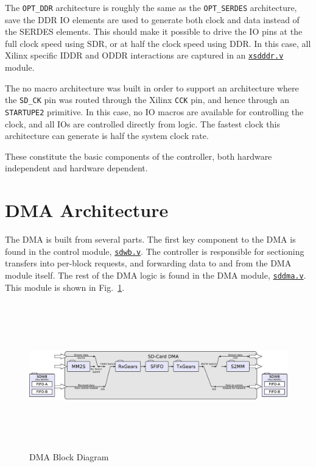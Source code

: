 \documentclass{gqtekspec}
\newcommand{\zhref}[2]{\href{#1}{\textcolor{dkblue}{#2}}}
\begin{document}
The {\tt OPT\_DDR} architecture is roughly the same as the {\tt OPT\_SERDES}
architecture, save the DDR IO elements are used to generate both clock and
data instead of the SERDES elements.  This should make it possible to drive
the IO pins at the full clock speed using SDR, or at half the clock speed
using DDR.  In this case, all Xilinx specific IDDR and ODDR interactions are
captured in an \zhref{../rtl/xsdddr.v}{\tt xsdddr.v} module.

The no macro architecture was built in order to support an architecture
where the {\tt SD\_CK} pin was routed through the Xilinx {\tt CCK} pin,
and hence through an {\tt STARTUPE2} primitive.  In this case, no IO macros
are available for controlling the clock, and all IOs are controlled directly
from logic.  The fastest clock this architecture can generate is half the
system clock rate.

These constitute the basic components of the controller, both hardware
independent and hardware dependent.
\section{DMA Architecture}\label{sec:arch-dma}
The DMA is built from several parts.  The first key component to the DMA is
found in the control module, \zhref{../rtl/sdwb.v}{\tt sdwb.v}.  The controller
is responsible for sectioning transfers into per-block requests, and forwarding
data to and from the DMA module itself.  The rest of the DMA logic is found
in the DMA module, \zhref{../rtl/sddma.v}{\tt sddma.v}.  This module is shown
in Fig.~\ref{fig:dmablocks}.
\begin{figure}\begin{center}
\includegraphics[height=2.5in]{gfx/dmablocks.eps}
\caption{DMA Block Diagram}\label{fig:dmablocks}
\end{center}\end{figure}
\end{document}
